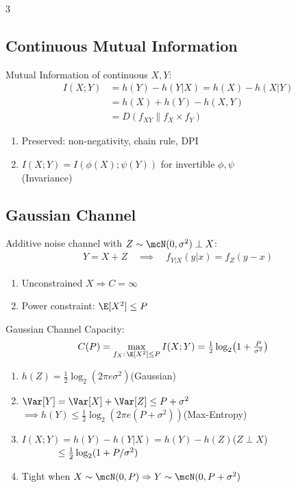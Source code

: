 \documentclass[12pt, a4paper]{article}
\begin{document}
\begin{multicols*}{3}
\subsection{Continuous Mutual Information}
Mutual Information of continuous $X,Y$:
\begin{align*}
  I(X;Y)&=h(Y)-h(Y|X)=h(X)-h(X|Y)\\
        &= h(X) + h(Y) - h(X,Y)\\
        &=D(f_{XY}\|f_X\times f_Y)
\end{align*}
\begin{enumerate}[\roman*.]
  \item Preserved: non-negativity, chain rule, DPI
  \item $I(X;Y)=I(\phi(X);\psi(Y))$ for invertible $\phi,\psi$\\\hfill(Invariance)
\end{enumerate}
\colbreak
\subsection{Gaussian Channel}
Additive noise channel with $Z\sim\mcN(0,\sigma^2)\perp X$:
\begin{align*}
  Y=X+Z\quad\implies\quad f_{Y|X}(y|x)=f_Z(y-x)
\end{align*}
\begin{enumerate}[\roman*.]
  \item Unconstrained $X\Rightarrow C=\infty$
  \item Power constraint: $\E[X^2]\le P$
\end{enumerate}
 
Gaussian Channel Capacity:
\begin{align*}
  C(P)&=\max_{f_X:\,\E[X^2]\le P}I(X;Y)=\tfrac{1}{2}\log_2\!\left(1+\tfrac{P}{\sigma^2}\right)
\end{align*}
\begin{enumerate}[\roman*.]
  \item $h(Z)=\tfrac{1}{2}\log_2(2\pi e\sigma^2)$\hfill(Gaussian)
  \item $\Var[Y]=\Var[X]+\Var[Z]\le P+\sigma^2$\\$\implies h(Y)\le\tfrac{1}{2}\log_2(2\pi e(P+\sigma^2))$\hfill(Max-Entropy)
  \item $I(X;Y)=h(Y)-h(Y|X)=h(Y)-h(Z)$\hfill($Z\perp X$)\\$\hspace{3.75em}\le\tfrac{1}{2}\log_2(1+P/\sigma^2)$
  \item Tight when $X\sim\mcN(0,P)\Rightarrow Y\sim\mcN(0,P+\sigma^2)$
\end{enumerate}
 

\end{multicols*}
\end{document}
